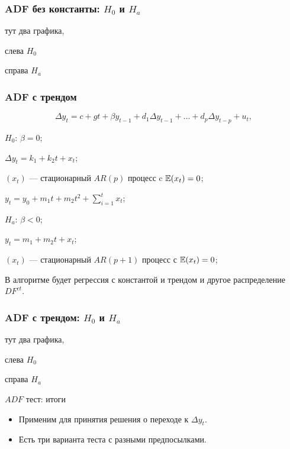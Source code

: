 \begin{frame}
  \frametitle{ADF без константы: $H_0$ и $H_a$}


  тут два графика,


  слева $H_0$


  справа $H_a$


\end{frame}



\begin{frame}
  \frametitle{ADF с трендом}
  \[
  \Delta y_t = c + g t + \beta y_{t-1} + d_1 \Delta y_{t-1} + \ldots + d_p \Delta y_{t-p} + u_t,  
  \]

  \pause

  \alert{$H_0$: $\beta = 0$};
  
  $\Delta y_t = k_1 + k_2 t + x_t$;
  
  $(x_t)$ — стационарный $AR(p)$ процесс c $\mathbb{E}(x_t) = 0$;

  $y_t = y_0 + m_1 t + m_2 t^2 + \sum_{i=1}^t x_t$;

  \pause

  \alert{$H_a$: $\beta < 0$};

  $y_t = m_1 + m_2 t + x_t$;
  
  $(x_t)$ — стационарный $AR(p + 1)$ процесс с $\mathbb{E}(x_t) = 0$;

  \pause 

  В алгоритме будет регрессия \alert{с константой и трендом} и другое распределение $DF^{ct}$.

\end{frame}


\begin{frame}
  \frametitle{ADF с трендом: $H_0$ и $H_a$}


  тут два графика,


  слева $H_0$


  справа $H_a$


\end{frame}


\begin{frame}{$ADF$ тест: итоги}

  \begin{itemize}[<+->]
    \item Применим для принятия решения о переходе к $\Delta y_t$.
    \item Есть три варианта теста с разными предпосылками.
  \end{itemize}
\end{frame}



